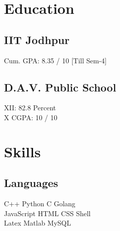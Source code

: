 \documentclass[]{deedy-resume-openfont}
\begin{document}
%
%

%
%

%
%

\begin{minipage}[t]{0.33\textwidth} 


\section{Education} 

\subsection{IIT Jodhpur}
Cum. GPA: 8.35 / 10 [Till Sem-4]\\



\sectionsep

\subsection{D.A.V. Public School}
 XII:  82.8 Percent \\
X  CGPA: 10 / 10 
\sectionsep
\section{Skills}
\subsection{Languages}
\textbullet{} C++ \textbullet{}   Python \textbullet{} C \textbullet{} Golang 
\\\textbullet{}JavaScript \textbullet{} HTML \textbullet{} CSS \textbullet{} Shell\\ \textbullet{}
Latex \textbullet{} Matlab \textbullet{} MySQL
\sectionsep

\end{minipage}
\end{document}
